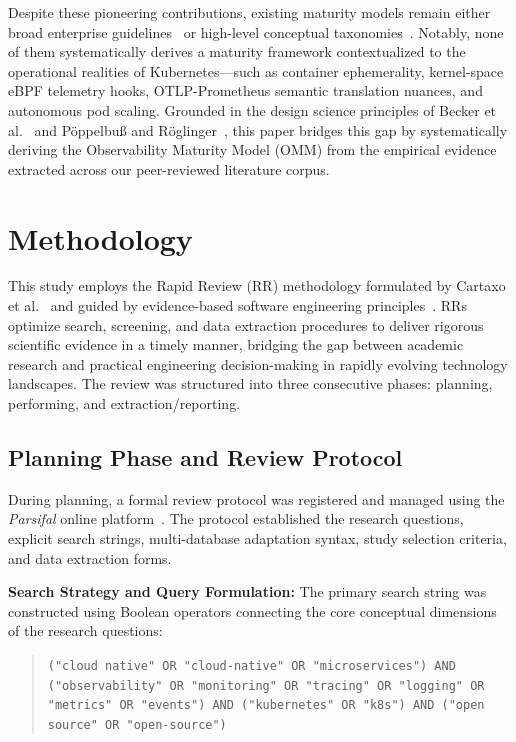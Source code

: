 \documentclass[sigconf, anonymous, balance=false]{acmart}
\begin{document}
Despite these pioneering contributions, existing maturity models remain either broad enterprise guidelines~\cite{nethala_2025, amgothu_2025} or high-level conceptual taxonomies~\cite{agarwal_2022, valbusa_2025, patel_2025}. Notably, none of them systematically derives a maturity framework contextualized to the operational realities of Kubernetes—such as container ephemerality, kernel-space eBPF telemetry hooks, OTLP-Prometheus semantic translation nuances, and autonomous pod scaling. Grounded in the design science principles of Becker et al.~\cite{becker_2009} and Pöppelbuß and Röglinger~\cite{poppelbuss_2011}, this paper bridges this gap by systematically deriving the Observability Maturity Model (OMM) from the empirical evidence extracted across our peer-reviewed literature corpus.

\section{Methodology}
\label{sec:methodology}

This study employs the Rapid Review (RR) methodology formulated by Cartaxo et al.~\cite{cartaxo_2018} and guided by evidence-based software engineering principles~\cite{kitchenham_2007, wohlin_2012}. RRs optimize search, screening, and data extraction procedures to deliver rigorous scientific evidence in a timely manner, bridging the gap between academic research and practical engineering decision-making in rapidly evolving technology landscapes. The review was structured into three consecutive phases: planning, performing, and extraction/reporting.

\subsection{Planning Phase and Review Protocol}
During planning, a formal review protocol was registered and managed using the \textit{Parsifal} online platform~\cite{parsifal}. The protocol established the research questions, explicit search strings, multi-database adaptation syntax, study selection criteria, and data extraction forms.

\textbf{Search Strategy and Query Formulation:} The primary search string was constructed using Boolean operators connecting the core conceptual dimensions of the research questions:
\begin{quote}
\small
\texttt{("cloud native" OR "cloud-native" OR "microservices") AND ("observability" OR "monitoring" OR "tracing" OR "logging" OR "metrics" OR "events") AND ("kubernetes" OR "k8s") AND ("open source" OR "open-source")}
\end{quote}
\end{document}
